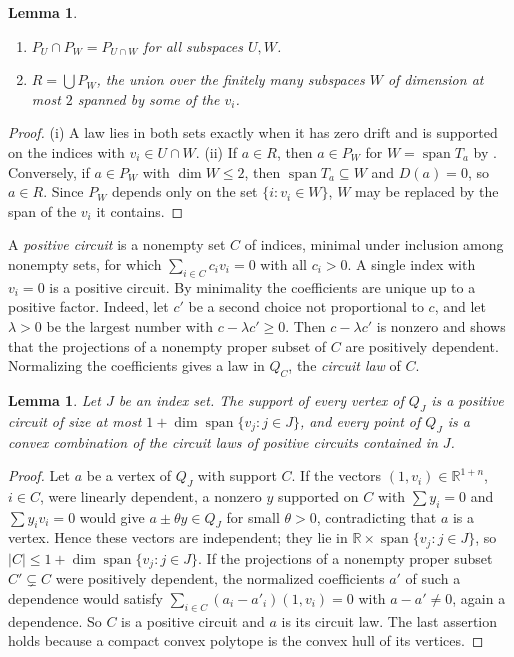 \documentclass[11pt]{article}
\newtheorem{lemma}[theorem]{Lemma}
\theoremstyle{remark}
\DeclareMathOperator{\spn}{span}
\newcommand{\R}{\mathbb{R}}
\begin{document}
\begin{lemma}\label{lem:pieces}
\begin{enumerate}[label=\textup{(\roman*)},nosep]
\item $P_U\cap P_W=P_{U\cap W}$ for all subspaces $U,W$.
\item $R=\bigcup P_W$, the union over the finitely many subspaces $W$ of dimension at most $2$ spanned by some of the
$v_i$.
\end{enumerate}
\end{lemma}

\begin{proof}
(i) A law lies in both sets exactly when it has zero drift and is supported on the indices with
$v_i\in U\cap W$. (ii) If $a\in R$, then $a\in P_W$ for $W=\spn T_a$ by . Conversely, if $a\in P_W$ with
$\dim W\le 2$, then $\spn T_a\subseteq W$ and $D(a)=0$, so $a\in R$. Since $P_W$ depends only on the set
$\{i:v_i\in W\}$, $W$ may be replaced by the span of the $v_i$ it contains.
\end{proof}

A \emph{positive circuit} is a nonempty set $C$ of indices, minimal under inclusion among nonempty sets, for which
$\sum_{i\in C}c_iv_i=0$ with all $c_i>0$. A single index with $v_i=0$ is a positive circuit. By minimality the coefficients are unique up to a positive
factor. Indeed, let $c'$ be a second choice not proportional to $c$, and let $\lambda>0$ be the largest number with
$c-\lambda c'\ge 0$. Then $c-\lambda c'$ is nonzero and shows that the projections of a nonempty proper subset of
$C$ are positively dependent. Normalizing the coefficients
gives a law in $Q_C$, the \emph{circuit law} of $C$.

\begin{lemma}\label{lem:vertex}
Let $J$ be an index set. The support of every vertex of $Q_J$ is a positive circuit of size at most
$1+\dim\spn\{v_j:j\in J\}$, and every point of $Q_J$ is a convex combination of the circuit laws of positive circuits
contained in $J$.
\end{lemma}

\begin{proof}
Let $a$ be a vertex of $Q_J$ with support $C$. If the vectors $(1,v_i)\in\R^{1+n}$, $i\in C$, were linearly dependent, a
nonzero $y$ supported on $C$ with $\sum y_i=0$ and $\sum y_iv_i=0$ would give $a\pm\theta y\in Q_J$ for small
$\theta>0$, contradicting that $a$ is a vertex. Hence these vectors are independent; they lie in
$\R\times\spn\{v_j:j\in J\}$, so $|C|\le 1+\dim\spn\{v_j:j\in J\}$. If the projections of a nonempty proper subset
$C'\subsetneq C$ were positively dependent, the normalized coefficients $a'$ of such a dependence would satisfy
$\sum_{i\in C}(a_i-a'_i)(1,v_i)=0$ with $a-a'\neq 0$, again a dependence. So $C$ is a positive circuit and $a$ is its circuit
law. The last assertion holds because a compact convex polytope is the convex hull of its vertices.
\end{proof}
\end{document}
